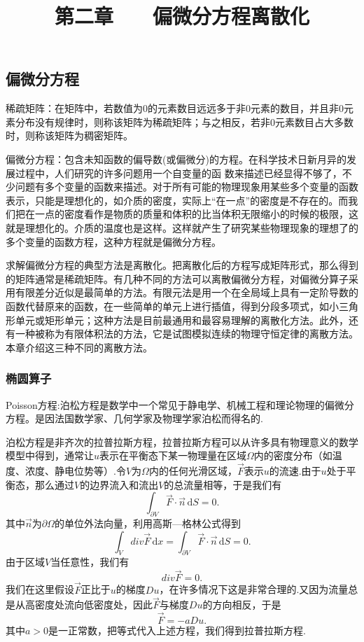 \documentclass{article}
\begin{document}
\title{第二章$\qquad$偏微分方程离散化}
\maketitle  %
\section{}
\subsection{偏微分方程}

 稀疏矩阵：在矩阵中，若数值为0的元素数目远远多于非0元素的数目，并且非0元素分布没有规律时，则称该矩阵为稀疏矩阵；与之相反，若非0元素数目占大多数时，则称该矩阵为稠密矩阵。

 偏微分方程：包含未知函数的偏导数(或偏微分)的方程。在科学技术日新月异的发展过程中，人们研究的许多问题用一个自变量的函
数来描述已经显得不够了，不少问题有多个变量的函数来描述。对于所有可能的物理现象用某些多个变量的函数表示，只能是理想化的，如介质的密度，实际上“在一点”的密度是不存在的。而我们把在一点的密度看作是物质的质量和体积的比当体积无限缩小的时候的极限，这就是理想化的。介质的温度也是这样。这样就产生了研究某些物理现象的理想了的多个变量的函数方程，这种方程就是偏微分方程。

求解偏微分方程的典型方法是离散化。把离散化后的方程写成矩阵形式，那么得到的矩阵通常是稀疏矩阵。有几种不同的方法可以离散偏微分方程，对偏微分算子采用有限差分近似是最简单的方法。有限元法是用一个在全局域上具有一定阶导数的函数代替原来的函数，在一些简单的单元上进行插值，得到分段多项式，如小三角形单元或矩形单元；这种方法是目前最通用和最容易理解的离散化方法。此外，还有一种被称为有限体积法的方法，它是试图模拟连续的物理守恒定律的离散方法。本章介绍这三种不同的离散方法。

\subsubsection{椭圆算子}
Poisson方程:泊松方程是数学中一个常见于静电学、机械工程和理论物理的偏微分方程。是因法国数学家、几何学家及物理学家泊松而得名的.

泊松方程是非齐次的拉普拉斯方程，拉普拉斯方程可以从许多具有物理意义的数学模型中得到，通常让$u$表示在平衡态下某一物理量在区域$\Omega$内的密度分布（如温度、浓度、静电位势等）.令$V$为$\Omega$内的任何光滑区域，$\overrightarrow{F}$表示$u$的流速.由于$u$处于平衡态，那么通过$V$的边界流入和流出$V$的总流量相等，于是我们有
$$\int_{\partial V} \overrightarrow{F}\cdot\overrightarrow{n} \, \mathrm{d}S =0.$$
其中$\overrightarrow{n}$为$\partial\Omega $的单位外法向量，利用高斯—格林公式得到
$$\int_{V} div\overrightarrow{F}\, \mathrm{d}x =\int_{\partial V} \overrightarrow{F}\cdot\overrightarrow{n} \, \mathrm{d}S =0.$$
由于区域$V$当任意性，我们有
$$div\overrightarrow{F}=0.$$
我们在这里假设$\overrightarrow{F}$正比于$u$的梯度$Du$，在许多情况下这是非常合理的.又因为流量总是从高密度处流向低密度处，因此$\overrightarrow{F}$与梯度$Du$的方向相反，于是
$$\overrightarrow{F}=-aDu.$$
其中$a>0$是一正常数，把等式代入上述方程，我们得到拉普拉斯方程.
\end{document}
